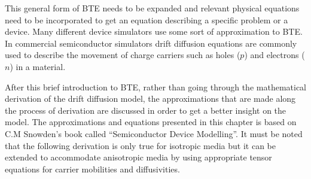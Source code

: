 \begin{doublespace}
This general form of BTE needs to be expanded and relevant physical equations need to be incorporated to get an equation describing a specific problem or a device. 
Many different device simulators use some sort of approximation to  BTE. In commercial semiconductor simulators drift diffusion equations are commonly used to describe the movement of charge carriers such as holes ($p$) and electrons ($n$) in a material\cite{Comsol}\cite{SILVACO}\cite{LumDev}. 

After this brief introduction to  BTE, rather than going through the mathematical derivation of the drift diffusion model, the approximations that are made along the process of derivation are discussed in order to get a better insight on the model. The approximations and equations presented in this chapter is based on C.M Snowden's book called ``Semiconductor Device Modelling''\cite{snowden}. It must be noted that the following derivation is only true for isotropic media but it can be extended to accommodate anisotropic media by using appropriate tensor equations for carrier mobilities and diffusivities.


\end{doublespace}
